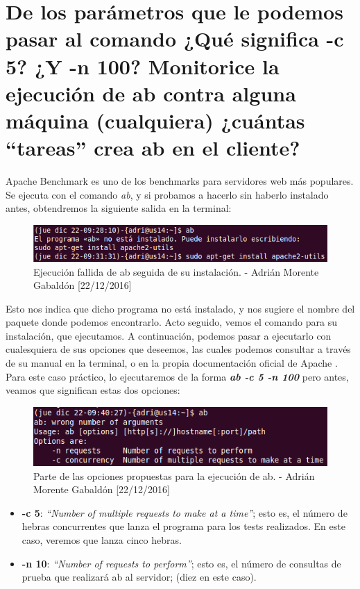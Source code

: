 \section{De los parámetros que le podemos pasar al comando ¿Qué significa -c 5? ¿Y -n 100? Monitorice la ejecución de ab contra alguna máquina (cualquiera) ¿cuántas ``tareas'' crea ab en el cliente?}
Apache Benchmark es uno de los benchmarks para servidores web más populares. Se ejecuta con el comando \textit{ab}, y si probamos a hacerlo sin haberlo instalado antes, obtendremos la siguiente salida en la terminal:
\begin{figure}[H]
	\centering
	\includegraphics[scale=1]{ab-install}
	\caption{Ejecución fallida de ab seguida de su instalación. - Adrián Morente Gabaldón [22/12/2016]}
	\label{figura1}
\end{figure}
Esto nos indica que dicho programa no está instalado, y nos sugiere el nombre del paquete donde podemos encontrarlo. Acto seguido, vemos el comando para su instalación, que ejecutamos.
A continuación, podemos pasar a ejecutarlo con cualesquiera de sus opciones que deseemos, las cuales podemos consultar a través de su manual en la terminal, o en la propia documentación oficial de Apache \cite{ab-help}. Para este caso práctico, lo ejecutaremos de la forma \textbf{\textit{ab -c 5 -n 100}} pero antes, veamos que significan estas dos opciones:
\begin{figure}[H]
	\centering
	\includegraphics[scale=1]{ab-options}
	\caption{Parte de las opciones propuestas para la ejecución de ab. - Adrián Morente Gabaldón [22/12/2016]}
	\label{figura2}
\end{figure}
\begin{itemize}
	\item \textbf{-c 5}: \textit{``Number of multiple requests to make at a time''}; esto es, el número de hebras concurrentes que lanza el programa para los tests realizados. En este caso, veremos que lanza cinco hebras.
	\item \textbf{-n 10}: \textit{``Number of requests to perform''}; esto es, el número de consultas de prueba que realizará ab al servidor; (diez en este caso).
\end{itemize}
